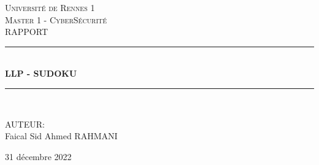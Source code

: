 \documentclass[12pt]{article}
\newcommand{\HRule}{\rule{\linewidth}{0.5mm}}
\begin{document}
	
\begin{titlepage}
  \begin{sffamily}
  \begin{center}
    
    \textsc{\LARGE Université de Rennes 1 }\\[2cm]
    \textsc{\LARGE Master 1 - CyberSécurité }\\[2cm]
    \textsc{\Large RAPPORT }\\[1.5cm]

    \HRule \\[0.4cm]
    { \huge \bfseries LLP - SUDOKU\\[0.4cm] }
    
    \HRule \\[2cm]
    
    

    \begin{minipage}{0.4\textwidth}
      \begin{center}\large
      	AUTEUR:\\
      	Faical Sid Ahmed RAHMANI
      \end{center}
    \end{minipage}

    \vfill    
    {\large  31 décembre 2022}

  \end{center}
  \end{sffamily}
\end{titlepage}
      
	\thispagestyle{empty}
  	\newpage
  	\tableofcontents
  	\setcounter{page}{0}
  	\newpage
  	
  	

  	
\end{document}
